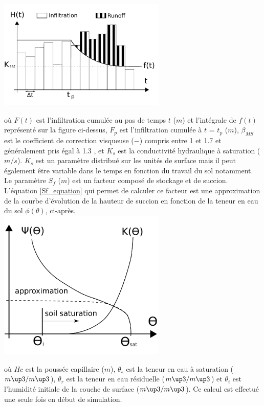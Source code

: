 \includegraphics[width=8cm]{doc/common/Separation_infiltration_ruissellement_MSeytoux.pdf}


où $F(t)$ est l'infiltration cumulée au pas de temps $t$ ($m$) et l'intégrale de $f(t)$ représenté sur la figure ci-dessus, $F_p$ est l’infiltration cumulée à $t$ = $t_p$ ($m$), $\beta_{MS}$ est le coefficient de correction visqueuse ($-$) compris entre 1 et 1.7 et généralement pris égal à 1.3 \cite{MorelS1984}, et $K_s$ est la conductivité hydraulique à saturation ($m/s$). $K_s$ est un paramètre distribué sur les unités de surface mais il peut également être variable dans le temps en fonction du travail du sol notamment.\\

Le paramètre $S_f$ ($m$) est un facteur composé de stockage et de succion. L'équation \ref{Sf_equation} qui permet de calculer ce facteur est une approximation de la courbe d'évolution de la hauteur de succion en fonction de la teneur en eau du sol $\phi(\theta)$, ci-après.\\

\includegraphics[width=8cm]{doc/common/Sf_approximation.pdf}


où $Hc$ est la poussée capillaire ($m$), $\theta_s$ est la teneur en eau à saturation ($m\up3 /m\up3$), $\theta_r$ est la teneur en eau résiduelle ($m\up3 /m\up3$) et $\theta_i$ est l’humidité initiale de la couche de surface ($m\up3 /m\up3$). Ce calcul est effectué une seule fois en début de simulation.\\


